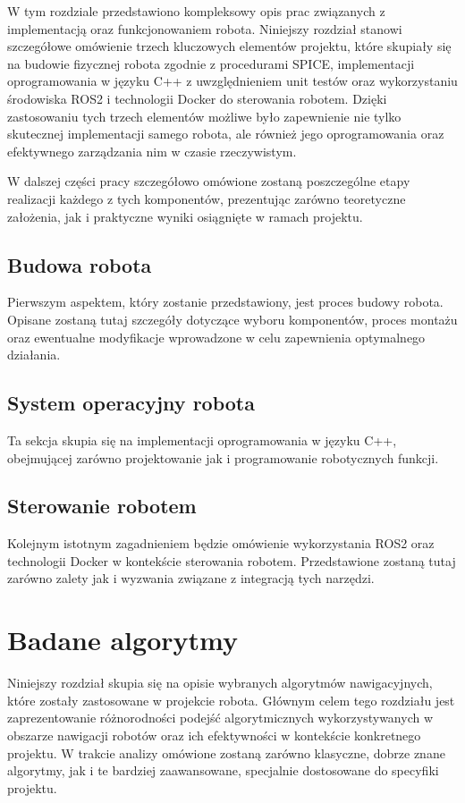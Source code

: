 \documentclass[12pt,twoside]{article}
\begin{document}
W tym rozdziale przedstawiono kompleksowy opis prac związanych z implementacją oraz funkcjonowaniem robota. Niniejszy rozdział stanowi szczegółowe omówienie trzech kluczowych elementów projektu, które skupiały się na budowie fizycznej robota zgodnie z procedurami SPICE, implementacji oprogramowania w języku C++ z uwzględnieniem unit testów oraz wykorzystaniu środowiska ROS2 i technologii Docker do sterowania robotem. Dzięki zastosowaniu tych trzech elementów możliwe było zapewnienie nie tylko skutecznej implementacji samego robota, ale również jego oprogramowania oraz efektywnego zarządzania nim w czasie rzeczywistym.

W dalszej części pracy szczegółowo omówione zostaną poszczególne etapy realizacji każdego z tych komponentów, prezentując zarówno teoretyczne założenia, jak i praktyczne wyniki osiągnięte w ramach projektu.

\subsection{Budowa robota}

Pierwszym aspektem, który zostanie przedstawiony, jest proces budowy robota. Opisane zostaną tutaj szczegóły dotyczące wyboru komponentów, proces montażu oraz ewentualne modyfikacje wprowadzone w celu zapewnienia optymalnego działania.

\subsection{System operacyjny robota}

Ta sekcja skupia się na implementacji oprogramowania w języku C++, obejmującej zarówno projektowanie jak i programowanie robotycznych funkcji. 

\subsection{Sterowanie robotem}

Kolejnym istotnym zagadnieniem będzie omówienie wykorzystania ROS2 oraz technologii Docker w kontekście sterowania robotem. Przedstawione zostaną tutaj zarówno zalety jak i wyzwania związane z integracją tych narzędzi.

\section{Badane algorytmy}

Niniejszy rozdział skupia się na opisie wybranych algorytmów nawigacyjnych, które zostały zastosowane w projekcie robota. Głównym celem tego rozdziału jest zaprezentowanie różnorodności podejść algorytmicznych wykorzystywanych w obszarze nawigacji robotów oraz ich efektywności w kontekście konkretnego projektu. W trakcie analizy omówione zostaną zarówno klasyczne, dobrze znane algorytmy, jak i te bardziej zaawansowane, specjalnie dostosowane do specyfiki projektu.
\end{document}
